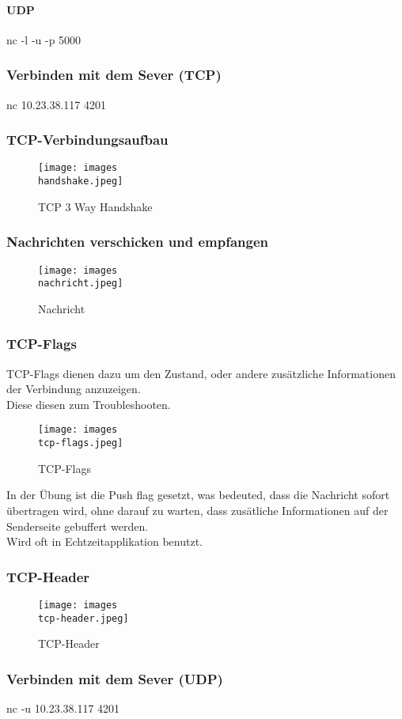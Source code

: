 \documentclass[a4paper]{article}
\begin{document}
\paragraph{UDP}
nc -l -u -p 5000

\subsubsection{Verbinden mit dem Sever (TCP)}
nc 10.23.38.117 4201
\subsubsection{TCP-Verbindungsaufbau}
\begin{figure}[h]
	\texttt{[image: images\\handshake.jpeg]}
	\caption{TCP 3 Way Handshake}
\end{figure}
\subsubsection{Nachrichten verschicken und empfangen}
\begin{figure}[h]
	\texttt{[image: images\\nachricht.jpeg]}
	\caption{Nachricht}
\end{figure}
\subsubsection{TCP-Flags}
TCP-Flags dienen dazu um den Zustand, oder andere zusätzliche Informationen der Verbindung anzuzeigen.\\
Diese diesen zum Troubleshooten.
\begin{figure}[h]
	\texttt{[image: images\\tcp-flags.jpeg]}
	\caption{TCP-Flags}
\end{figure}
In der Übung ist die Push flag gesetzt, was bedeuted, dass die Nachricht sofort übertragen wird, ohne darauf zu warten, dass zusätliche Informationen auf der Senderseite gebuffert werden.
\\ Wird oft in Echtzeitapplikation benutzt.
\subsubsection{TCP-Header}
\begin{figure}[h]
	\texttt{[image: images\\tcp-header.jpeg]}
	\caption{TCP-Header}
\end{figure}
\subsubsection{Verbinden mit dem Sever (UDP)}
nc -u 10.23.38.117 4201
\end{document}
